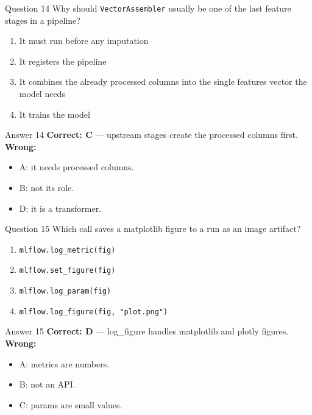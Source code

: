 \documentclass[aspectratio=169,11pt]{beamer}
\begin{document}
\begin{frame}{Question 14}
Why should \texttt{VectorAssembler} usually be one of the last feature stages in a pipeline?
\begin{enumerate}[label=\Alph*.]
\item It must run before any imputation
\item It registers the pipeline
\item It combines the already processed columns into the single features vector the model needs
\item It trains the model
\end{enumerate}
\end{frame}
\begin{frame}{Answer 14}
\textbf{Correct: C} --- upstream stages create the processed columns first.\\
\vspace{0.5em}
\textbf{Wrong:}
\begin{itemize}
\item A: it needs processed columns.
\item B: not its role.
\item D: it is a transformer.
\end{itemize}
\end{frame}

\begin{frame}{Question 15}
Which call saves a matplotlib figure to a run as an image artifact?
\begin{enumerate}[label=\Alph*.]
\item \texttt{mlflow.log\_metric(fig)}
\item \texttt{mlflow.set\_figure(fig)}
\item \texttt{mlflow.log\_param(fig)}
\item \texttt{mlflow.log\_figure(fig, "plot.png")}
\end{enumerate}
\end{frame}
\begin{frame}{Answer 15}
\textbf{Correct: D} --- log\_figure handles matplotlib and plotly figures.\\
\vspace{0.5em}
\textbf{Wrong:}
\begin{itemize}
\item A: metrics are numbers.
\item B: not an API.
\item C: params are small values.
\end{itemize}
\end{frame}
\end{document}
